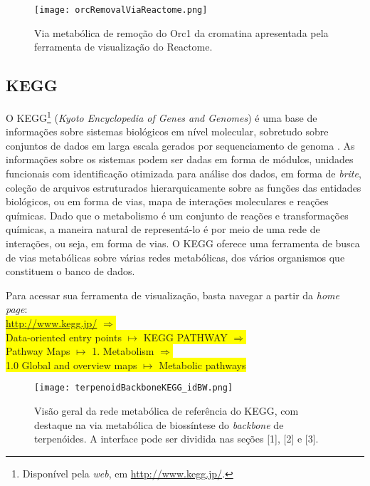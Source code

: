 \begin{figure}[!h]
\centering
\texttt{[image: orcRemovalViaReactome.png]}
\caption{Via metabólica de remoção do Orc1 da cromatina apresentada pela ferramenta de visualização do Reactome.}
\label{orcRemovalViaReactome}
\end{figure}



\subsection{KEGG}

\indent O KEGG\footnote{Disponível pela \textit{web}, em \url{http://www.kegg.jp/}.} (\textit{Kyoto Encyclopedia of Genes and Genomes}) é uma base de informações sobre sistemas biológicos em nível molecular, sobretudo sobre conjuntos de dados em larga escala gerados por sequenciamento de genoma \cite{keggOverview}. 
\indent As informações sobre os sistemas podem ser dadas em forma de módulos, unidades funcionais com identificação otimizada para análise dos dados, em forma de \textit{brite}, coleção de arquivos estruturados hierarquicamente sobre as funções das entidades biológicos, ou em forma de vias, mapa de interações moleculares e reações químicas.
\indent Dado que o metabolismo é um conjunto de reações e transformações químicas, a maneira natural de representá-lo é por meio de uma rede de interações, ou seja, em forma de vias. O KEGG oferece uma ferramenta de busca de vias metabólicas sobre várias redes metabólicas, dos vários organismos que constituem o banco de dados.

\indent Para acessar sua ferramenta de visualização, basta navegar a partir da \textit{home page}: \\

\indent \colorbox{yellow}{\url{http://www.kegg.jp/} $\Rightarrow$} \\
\indent \colorbox{yellow}{Data-oriented entry points  $\mapsto$ KEGG PATHWAY $\Rightarrow$} \\
\indent \colorbox{yellow}{Pathway Maps $\mapsto$ 1. Metabolism  $\Rightarrow$} \\
\indent \colorbox{yellow}{1.0 Global and overview maps $\mapsto$ Metabolic pathways} \\

\begin{figure}[!h]
\centering
\texttt{[image: terpenoidBackboneKEGG\_idBW.png]}
\caption{Visão geral da rede metabólica de referência do KEGG, com destaque na via metabólica de biossíntese do \textit{backbone} de terpenóides. A interface pode ser dividida nas seções [1], [2] e [3].}
\label{terpenoidBackboneKEGG_id}
\end{figure}

